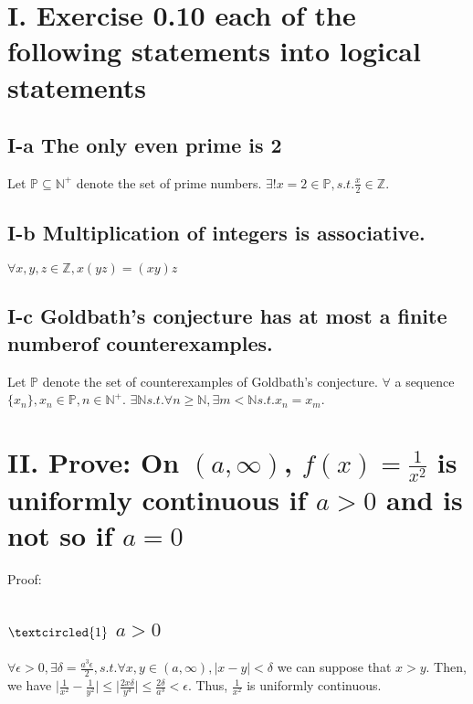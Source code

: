 \documentclass[twoside,a4paper]{article}
\begin{document}
\pagestyle{fancy}
\fancyhead{}


\section*{I. Exercise 0.10 \small{each of the following statements into logical statements}}

\subsection*{I-a \small{The only even prime is 2}}

Let $\mathbb{P} \subseteq \mathbb{N}^+$ denote the set of prime numbers. 
$\exists! x = 2 \in \mathbb{P}, s.t. \frac{x}{2} \in \mathbb{Z}.$ 

\subsection*{I-b \small{Multiplication of integers is associative.}}
$\forall x,y,z \in \mathbb{Z}, x(yz)=(xy)z$

\subsection*{I-c \small{Goldbath's conjecture has at most a finite numberof counterexamples.}}

Let $\mathbb{P}$ denote the set of counterexamples of Goldbath's conjecture.
$\forall$ a sequence $\{ x_{n} \}, x_{n} \in \mathbb{P}, n \in \mathbb{N}^+$.
$\exists \mathbb{N} s.t. \forall n \geq \mathbb{N}, 
\exists m < \mathbb{N} s.t. x_{n} = x_{m}$.  

\section*{II. \small{Prove: On $(a, \infty)$, $f(x)=\frac{1}{x^2}$ is uniformly continuous if $a>0$ and is not so if $a=0$  } }
Proof:

\subsection*{\small{$\textcircled{1}$ $a>0$}}

$\forall \epsilon > 0, \exists \delta = \frac{a^{3}\epsilon}{2},
s.t. \forall x, y \in (a, \infty), \mid x - y \mid < \delta$
we can suppose that $x > y$.
Then, we have $\mid\frac{1}{x^2} - \frac{1}{y^2}\mid \leq \mid\frac{2x\delta}
{y^4}\mid \leq \frac{2\delta}{a^3} < \epsilon$.
Thus, $\frac{1}{x^2}$ is uniformly continuous.
\end{document}
